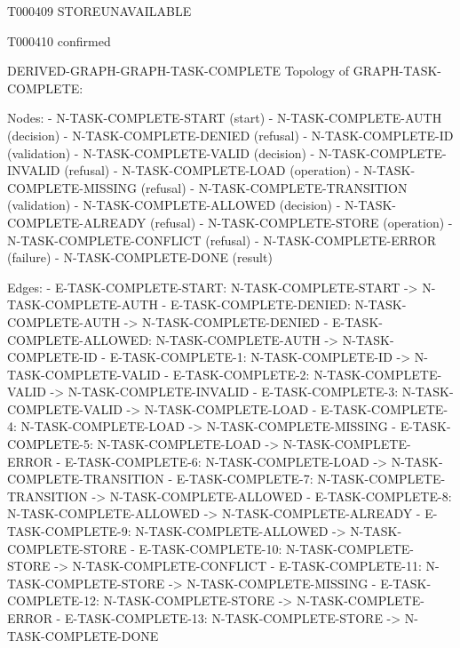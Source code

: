 \documentclass[11pt,a4paper]{article}
\begin{document}
\begin{atlastext}{T000409}
STORE\AtlasCharUnderscore{}UNAVAILABLE
\end{atlastext}
\begin{atlastext}{T000410}
confirmed
\end{atlastext}
\par\noindent\begin{minipage}{\linewidth}
\begin{atlasderived}{DERIVED-GRAPH-GRAPH-TASK-COMPLETE}
Topology of GRAPH-TASK-COMPLETE:

Nodes:
- N-TASK-COMPLETE-START (start)
- N-TASK-COMPLETE-AUTH (decision)
- N-TASK-COMPLETE-DENIED (refusal)
- N-TASK-COMPLETE-ID (validation)
- N-TASK-COMPLETE-VALID (decision)
- N-TASK-COMPLETE-INVALID (refusal)
- N-TASK-COMPLETE-LOAD (operation)
- N-TASK-COMPLETE-MISSING (refusal)
- N-TASK-COMPLETE-TRANSITION (validation)
- N-TASK-COMPLETE-ALLOWED (decision)
- N-TASK-COMPLETE-ALREADY (refusal)
- N-TASK-COMPLETE-STORE (operation)
- N-TASK-COMPLETE-CONFLICT (refusal)
- N-TASK-COMPLETE-ERROR (failure)
- N-TASK-COMPLETE-DONE (result)

Edges:
- E-TASK-COMPLETE-START: N-TASK-COMPLETE-START -> N-TASK-COMPLETE-AUTH
- E-TASK-COMPLETE-DENIED: N-TASK-COMPLETE-AUTH -> N-TASK-COMPLETE-DENIED
- E-TASK-COMPLETE-ALLOWED: N-TASK-COMPLETE-AUTH -> N-TASK-COMPLETE-ID
- E-TASK-COMPLETE-1: N-TASK-COMPLETE-ID -> N-TASK-COMPLETE-VALID
- E-TASK-COMPLETE-2: N-TASK-COMPLETE-VALID -> N-TASK-COMPLETE-INVALID
- E-TASK-COMPLETE-3: N-TASK-COMPLETE-VALID -> N-TASK-COMPLETE-LOAD
- E-TASK-COMPLETE-4: N-TASK-COMPLETE-LOAD -> N-TASK-COMPLETE-MISSING
- E-TASK-COMPLETE-5: N-TASK-COMPLETE-LOAD -> N-TASK-COMPLETE-ERROR
- E-TASK-COMPLETE-6: N-TASK-COMPLETE-LOAD -> N-TASK-COMPLETE-TRANSITION
- E-TASK-COMPLETE-7: N-TASK-COMPLETE-TRANSITION -> N-TASK-COMPLETE-ALLOWED
- E-TASK-COMPLETE-8: N-TASK-COMPLETE-ALLOWED -> N-TASK-COMPLETE-ALREADY
- E-TASK-COMPLETE-9: N-TASK-COMPLETE-ALLOWED -> N-TASK-COMPLETE-STORE
- E-TASK-COMPLETE-10: N-TASK-COMPLETE-STORE -> N-TASK-COMPLETE-CONFLICT
- E-TASK-COMPLETE-11: N-TASK-COMPLETE-STORE -> N-TASK-COMPLETE-MISSING
- E-TASK-COMPLETE-12: N-TASK-COMPLETE-STORE -> N-TASK-COMPLETE-ERROR
- E-TASK-COMPLETE-13: N-TASK-COMPLETE-STORE -> N-TASK-COMPLETE-DONE
\end{atlasderived}
\end{minipage}\par
\end{document}
